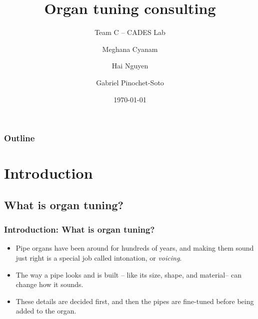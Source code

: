 \documentclass{beamer}
\title{Organ tuning consulting}
\subtitle{Team C -- CADES Lab}
\author[Cyanam, Nguyen, Pinochet-Soto]{Meghana Cyanam \and Hai Nguyen \and Gabriel Pinochet-Soto}
\institute{Portland State University}
\date{\today}
\begin{document}
    {
    \begin{frame}
		\titlepage
	\end{frame}
    }

    \begin{frame}
        \frametitle{Outline}
        \tableofcontents
    \end{frame}

    \section{Introduction}
    \subsection{What is organ tuning?}
	\begin{frame}
        \frametitle{Introduction: What is organ tuning?}
		\begin{itemize}
            \item<1->
                Pipe organs have been around for hundreds of years, and making them sound just
                right is a special job called intonation, or \emph{voicing}.

			\item<2->
                The way a pipe looks and is built -- like its size, shape, and material-- can
                change how it sounds.

			\item<3->
                These details are decided first, and then the pipes are fine-tuned before being
                added to the organ.
		\end{itemize}
	\end{frame}

\end{document}
